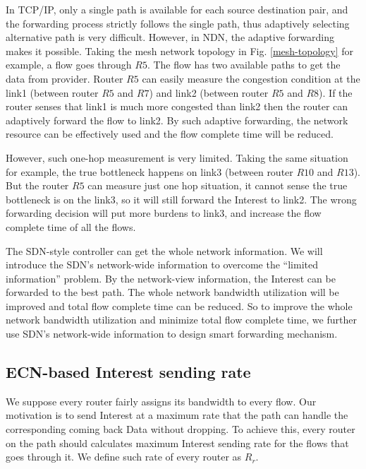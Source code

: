 In TCP/IP, only a single path is available for each source destination pair, and the forwarding process strictly follows the single path, thus adaptively selecting alternative path is very difficult. However, in NDN, the adaptive forwarding makes it possible. Taking the mesh network topology in Fig. \ref{mesh-topology} for example, a flow goes through $R5$. The flow has two available paths to get the data from provider. Router $R5$ can easily measure the congestion condition at the link1 (between router $R5$ and $R7$) and link2 (between router $R5$ and $R8$). If the router senses that link1 is much more congested than link2 then the router can adaptively forward the flow to link2. By such adaptive forwarding, the network resource can be effectively used and the flow complete time will be reduced.

However, such one-hop measurement is very limited. Taking the same situation for example, the true bottleneck happens on link3 (between router $R10$ and $R13$). But the router $R5$ can measure just one hop situation, it cannot sense the true bottleneck is on the link3, so it will still forward the Interest to link2. The wrong forwarding decision will put more burdens to link3, and increase the flow complete time of all the flows.

The SDN-style controller can get the whole network information. We will introduce the SDN's network-wide information to overcome the ``limited information'' problem. By the network-view information, the Interest can be forwarded to the best path. The whole network bandwidth utilization will be improved and total flow complete time can be reduced. So to improve the whole network bandwidth utilization and minimize total flow complete time, we further use SDN's network-wide information to design smart forwarding mechanism.

\subsection{ECN-based Interest sending rate}
We suppose every router fairly assigns its bandwidth to every flow. Our motivation is to send Interest at a maximum rate that the path can handle the corresponding coming back Data without dropping. To achieve this, every router on the path should calculates maximum Interest sending rate for the flows that goes through it. We define such rate of every router as $R_{r}$.


